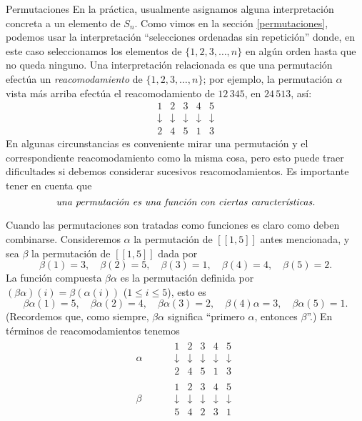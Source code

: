 \begin{section}{Permutaciones}
En la práctica, usualmente asignamos alguna interpretación concreta a un elemento de $S_n$. Como vimos en la sección \ref{permutaciones}, podemos usar la interpretación ``selecciones ordenadas sin
repetición''   donde, en este caso seleccionamos los elementos de $\{1,2,3,\ldots,n\}$ en algún orden hasta que no queda ninguno. Una interpretación
relacionada es que una permutación efectúa un {\it reacomodamiento} de $\{1,2,3,\ldots,n\}$; por ejemplo, la permutación $\alpha$ vista más arriba efectúa el reacomodamiento
de $12\,345$, en $24\,513$, así:
$$
\begin{matrix} 1&2&3&4&5 \\
\downarrow&\downarrow&\downarrow&\downarrow&\downarrow\\2 &4 &5 &1
& 3
\end{matrix}
$$
En algunas circunstancias es conveniente mirar una permutación y el correspondiente reacomodamiento como la misma cosa, pero esto puede traer dificultades si debemos considerar sucesivos reacomodamientos. Es importante tener en cuenta que 
$$
\text{\it una permutación es una función con ciertas
características.}
$$

Cuando las permutaciones son tratadas como funciones es claro como deben combinarse. Consideremos $\alpha$ la permutación de $[[1,5]]$ antes mencionada, y sea $\beta$ la permutación de $[[1,5]]$ dada por 
$$
\beta(1)=3,\quad \beta(2)=5,\quad \beta(3)=1,\quad
\beta(4)=4,\quad \beta(5)=2.
$$
La función compuesta $\beta\alpha$ es la permutación definida por $(\beta\alpha)(i)= \beta(\alpha(i))$ ($1\le i\le 5$), esto es 
$$
\beta\alpha(1)=5,\quad \beta\alpha(2)=4,\quad
\beta\alpha(3)=2,\quad \beta(4)\alpha=3,\quad \beta\alpha(5)=1.
$$
(Recordemos que, como siempre, $\beta\alpha$ significa ``primero $\alpha$, entonces $\beta$''.) En términos de reacomodamientos tenemos
$$\begin{aligned}
\alpha\quad&\quad\begin{matrix} 1&2&3&4&5 \\
\downarrow&\downarrow&\downarrow&\downarrow&\downarrow\\2 &4 &5 &1
& 3
\end{matrix} \\
\beta \quad&\quad \begin{matrix} 1&2&3&4&5 \\
\downarrow&\downarrow&\downarrow&\downarrow&\downarrow\\5 &4 &2 &3
& 1
\end{matrix}
 \end{aligned}
$$




\end{section}

